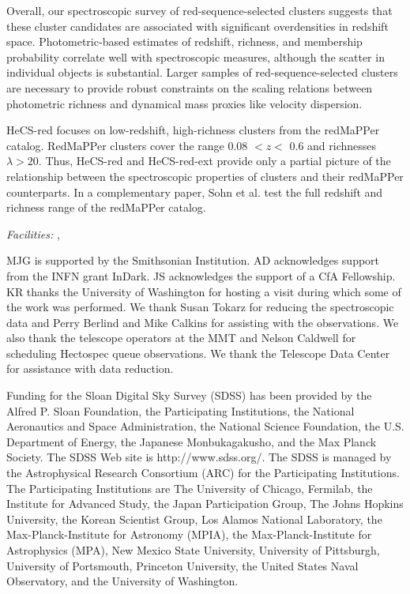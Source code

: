 Overall, our spectroscopic survey of red-sequence-selected clusters suggests 
that these cluster candidates are associated with significant overdensities in 
redshift space.  Photometric-based estimates of redshift, richness, and membership
probability correlate well with spectroscopic measures, although the scatter 
in individual objects is substantial.  Larger samples of red-sequence-selected 
clusters are necessary to provide robust constraints on the scaling relations 
between photometric richness and dynamical mass proxies like velocity dispersion.

HeCS-red focuses on low-redshift, high-richness clusters from the redMaPPer catalog.
RedMaPPer clusters cover the range 0.08 $< z <$ 0.6 and richnesses $\lambda > 20$. 
Thus, HeCS-red and HeCS-red-ext provide only a partial picture of the relationship 
between the spectroscopic properties of clusters and their redMaPPer counterparts. 
In a complementary paper, Sohn et al. test the full redshift and richness range of the 
redMaPPer catalog. 


{\it Facilities:} , 


\acknowledgements


MJG is supported by the Smithsonian Institution.
AD acknowledges support from 
the INFN grant InDark.
JS acknowledges the support of a CfA Fellowship.
KR thanks the University of Washington for hosting a visit during which some of the work was performed.
We 
thank Susan Tokarz for reducing the spectroscopic data and Perry 
Berlind and Mike Calkins for assisting with the observations.  We also thank 
the telescope operators at the MMT and Nelson Caldwell for scheduling 
Hectospec queue observations. We thank the Telescope Data Center for assistance with data reduction.

Funding for
the Sloan Digital Sky Survey (SDSS) has been provided by the Alfred
P. Sloan Foundation, the Participating Institutions, the National
Aeronautics and Space Administration, the National Science Foundation,
the U.S. Department of Energy, the Japanese Monbukagakusho, and the
Max Planck Society. The SDSS Web site is http://www.sdss.org/.  The
SDSS is managed by the Astrophysical Research Consortium (ARC) for the
Participating Institutions. 
The Participating Institutions are The
University of Chicago, Fermilab, the Institute for Advanced Study, the
Japan Participation Group, The Johns Hopkins University, the Korean
Scientist Group, Los Alamos National Laboratory, the
Max-Planck-Institute for Astronomy (MPIA), the Max-Planck-Institute
for Astrophysics (MPA), New Mexico State University, University of
Pittsburgh, University of Portsmouth, Princeton University, the United
States Naval Observatory, and the University of Washington.











 



